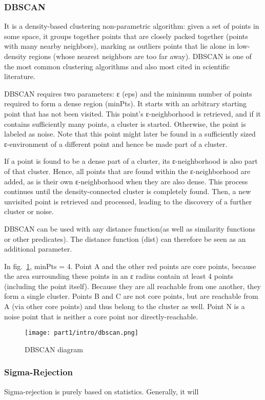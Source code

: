 \documentclass[12pt]{article}
\begin{document}
\subsubsection{DBSCAN}
It is a density-based clustering non-parametric algorithm: given a set of points in some space, it groups together points that are closely packed together (points with many nearby neighbors), marking as outliers points that lie alone in low-density regions (whose nearest neighbors are too far away). DBSCAN is one of the most common clustering algorithms and also most cited in scientific literature.

DBSCAN requires two parameters: ε (eps) and the minimum number of points required to form a dense region (minPts). It starts with an arbitrary starting point that has not been visited. This point's ε-neighborhood is retrieved, and if it contains sufficiently many points, a cluster is started. Otherwise, the point is labeled as noise. Note that this point might later be found in a sufficiently sized ε-environment of a different point and hence be made part of a cluster.

If a point is found to be a dense part of a cluster, its ε-neighborhood is also part of that cluster. Hence, all points that are found within the ε-neighborhood are added, as is their own ε-neighborhood when they are also dense. This process continues until the density-connected cluster is completely found. Then, a new unvisited point is retrieved and processed, leading to the discovery of a further cluster or noise.

DBSCAN can be used with any distance function(as well as similarity functions or other predicates). The distance function (dist) can therefore be seen as an additional parameter.

In fig.~\ref{dbscan}, minPts = 4. Point A and the other red points are core points, because the area surrounding these points in an ε radius contain at least 4 points (including the point itself). Because they are all reachable from one another, they form a single cluster. Points B and C are not core points, but are reachable from A (via other core points) and thus belong to the cluster as well. Point N is a noise point that is neither a core point nor directly-reachable.
\begin{figure}[H]
    \centering
    \texttt{[image: part1/intro/dbscan.png]}
    \caption{DBSCAN diagram}
    \label{dbscan}
\end{figure}
\subsubsection{Sigma-Rejection}
Sigma-rejection is purely based on statistics. Generally, it will 
\end{document}
